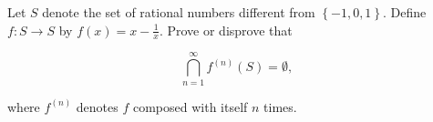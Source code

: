 \begin{problem}
    Let \( S \) denote the set of rational numbers different from \( \left\{-1, 0, 1\right\} \). Define \( f : S \to S \) by \( f\left(x\right) = x - \frac{1}{x} \). Prove or disprove that

    \[
        \bigcap_{n=1}^{\infty} f^{\left(n\right)}\left(S\right) = \emptyset,
    \]

    where \( f^{\left(n\right)} \) denotes \( f \) composed with itself \( n \) times.
\end{problem}
